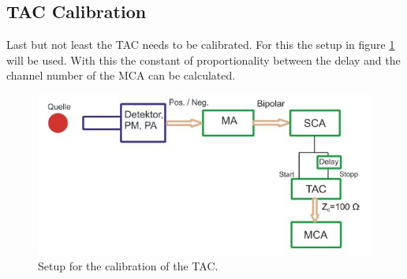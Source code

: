 \documentclass[30pt,a4paper]{article}
\begin{document}
 	\subsection{TAC Calibration}
 	Last but not least the TAC needs to be calibrated. For this the setup in figure \ref{setup_TC} will be used. With this the constant of proportionality between the delay and the channel number of the MCA can be calculated. 
 	\begin{figure}[h]
 		\includegraphics{Bilder/Circuit_DC_calib}
 		\centering
 		\caption{\small Setup for the calibration of the TAC.}
 		\label{setup_TC}
 	\end{figure}\\
\end{document}
